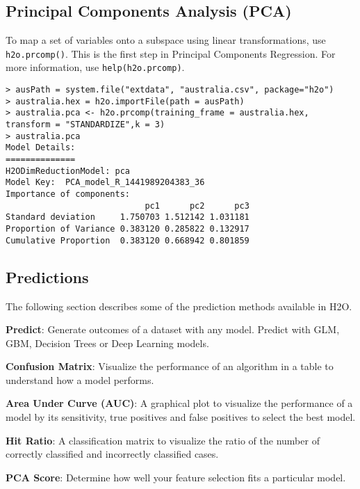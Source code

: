 {{\subsection{Principal Components Analysis (PCA)}


To map a set of variables onto a subspace using linear transformations, use {\texttt{h2o.prcomp()}}. This is the first step in Principal Components Regression. For more information, use {\texttt{help(h2o.prcomp)}}.

\waterExampleInR
\medskip
\begin{lstlisting}[style=R]
> ausPath = system.file("extdata", "australia.csv", package="h2o")
> australia.hex = h2o.importFile(path = ausPath)
> australia.pca <- h2o.prcomp(training_frame = australia.hex, transform = "STANDARDIZE",k = 3)
> australia.pca
Model Details:
==============
H2ODimReductionModel: pca
Model Key:  PCA_model_R_1441989204383_36
Importance of components:
                            pc1      pc2      pc3
Standard deviation     1.750703 1.512142 1.031181
Proportion of Variance 0.383120 0.285822 0.132917
Cumulative Proportion  0.383120 0.668942 0.801859
\end{lstlisting}




\subsection{Predictions}
\label{ssec:Predictions}

The following section describes some of the prediction methods available in H2O.

{\textbf{Predict}}: Generate outcomes of a dataset with any model. Predict with GLM, GBM, Decision Trees or Deep Learning models.

{\textbf{Confusion Matrix}}: Visualize the performance of an algorithm in a table to understand how a model performs.

{\textbf{Area Under Curve (AUC)}}: A graphical plot to visualize the performance of a model by its sensitivity, true positives and false positives to select the best model.

{\textbf{Hit Ratio}}: A classification matrix to visualize the ratio of the number of correctly classified and incorrectly classified cases.

{\textbf{PCA Score}}: Determine how well your feature selection fits a particular model.

}}
